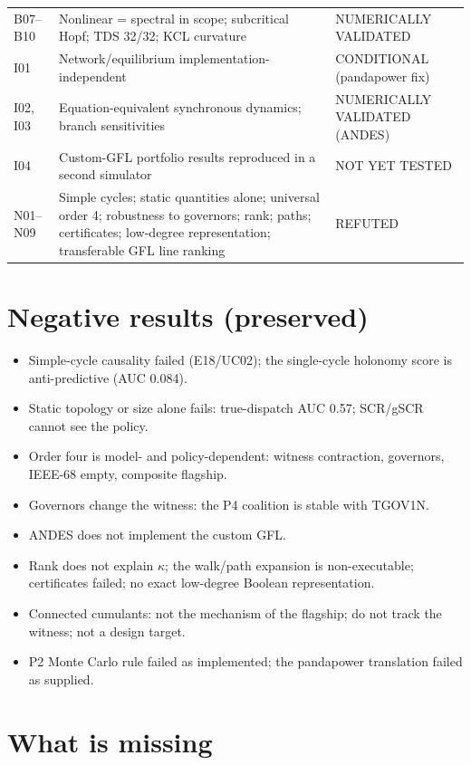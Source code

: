 \documentclass[10pt,a4paper]{article}
\theoremstyle{definition}
\begin{document}
\begin{longtable}{@{}L{1.0cm}L{10.6cm}L{3.8cm}@{}}
B07--B10 & Nonlinear = spectral in scope; subcritical Hopf; TDS 32/32; KCL curvature & NUMERICALLY VALIDATED\\
I01 & Network/equilibrium implementation-independent & CONDITIONAL (pandapower fix)\\
I02, I03 & Equation-equivalent synchronous dynamics; branch sensitivities & NUMERICALLY VALIDATED (ANDES)\\
I04 & Custom-GFL portfolio results reproduced in a second simulator & NOT YET TESTED\\
N01--N09 & Simple cycles; static quantities alone; universal order 4; robustness to governors; rank; paths; certificates; low-degree representation; transferable GFL line ranking & REFUTED\\
\bottomrule
\end{longtable}
\normalsize

\section{Negative results (preserved)}
\begin{itemize}
\item Simple-cycle causality failed (E18/UC02); the single-cycle holonomy score is anti-predictive (AUC 0.084).
\item Static topology or size alone fails: true-dispatch AUC 0.57; SCR/gSCR cannot see the policy.
\item Order four is model- and policy-dependent: witness contraction, governors, IEEE-68 empty, composite flagship.
\item Governors change the witness: the P4 coalition is stable with TGOV1N.
\item ANDES does not implement the custom GFL.
\item Rank does not explain $\kappa$; the walk/path expansion is non-executable; certificates failed; no exact low-degree Boolean representation.
\item Connected cumulants: not the mechanism of the flagship; do not track the witness; not a design target.
\item P2 Monte Carlo rule failed as implemented; the pandapower translation failed as supplied.
\end{itemize}

\section{What is missing}\label{sec:missing}
\end{document}
